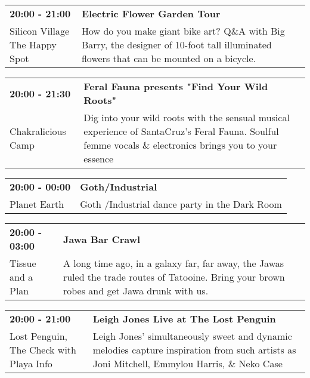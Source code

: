 \begin{tabular}{ p{1in} p{2.2in} }
    \textbf{20:00 - 21:00} & \textbf{Electric Flower Garden Tour} \\
    Silicon Village \newline The Happy Spot & How do you make giant bike art? Q\&A with Big Barry, the designer of 10-foot tall illuminated flowers that can be mounted on a bicycle. \\
    \hline 
\end{tabular}
    
\begin{tabular}{ p{1in} p{2.2in} }
    \textbf{20:00 - 21:30} & \textbf{Feral Fauna presents "Find Your Wild Roots"} \\
    Chakralicious Camp \newline  & Dig into your wild roots with the sensual musical experience of SantaCruz's Feral Fauna. Soulful femme vocals \& electronics brings you to your essence \\
    \hline 
\end{tabular}
    
\begin{tabular}{ p{1in} p{2.2in} }
    \textbf{20:00 - 00:00} & \textbf{Goth/Industrial} \\
    Planet Earth \newline  & Goth /Industrial dance party in the Dark Room \\
    \hline 
\end{tabular}
    
\begin{tabular}{ p{1in} p{2.2in} }
    \textbf{20:00 - 03:00} & \textbf{Jawa Bar Crawl} \\
    Tissue and a Plan \newline  & A long time ago, in a galaxy far, far away, the Jawas ruled the trade routes of Tatooine. Bring your brown robes and get Jawa drunk with us. \\
    \hline 
\end{tabular}
    
\begin{tabular}{ p{1in} p{2.2in} }
    \textbf{20:00 - 21:00} & \textbf{Leigh Jones Live at The Lost Penguin} \\
    Lost Penguin, The \newline Check with Playa Info & Leigh Jones' simultaneously sweet and dynamic melodies capture inspiration from such artists as Joni Mitchell, Emmylou Harris, \& Neko Case \\
    \hline 
\end{tabular}
    
